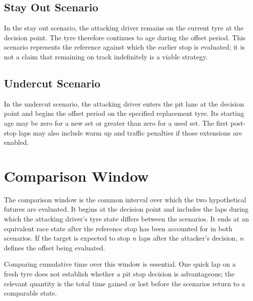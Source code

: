 
\subsection{Stay Out Scenario}
\label{subsec:reference-scenario}

In the stay out scenario, the attacking driver remains on the current tyre at
the decision point. The tyre therefore continues to age during the offset
period. This scenario represents the reference against which the earlier stop
is evaluated; it is not a claim that remaining on track indefinitely is a
viable strategy.


\subsection{Undercut Scenario}
\label{subsec:undercut-scenario}

In the undercut scenario, the attacking driver enters the pit lane at the
decision point and begins the offset period on the specified replacement tyre.
Its starting age may be zero for a new set or greater than zero for a used set.
The first post-stop laps may also include warm up and traffic penalties if
those extensions are enabled.

\section{Comparison Window}
\label{sec:comparison-window}

The comparison window is the common interval over which the two hypothetical
futures are evaluated. It begins at the decision point and includes the laps
during which the attacking driver's tyre state differs between the scenarios.
It ends at an equivalent race state after the reference stop has been accounted
for in both scenarios. If the target is expected to stop $n$ laps after the
attacker's decision, $n$ defines the offset being evaluated.

Comparing cumulative time over this window is essential. One quick lap on a
fresh tyre does not establish whether a pit stop decision is advantageous; the
relevant quantity is the total time gained or lost before the scenarios return
to a comparable state.

